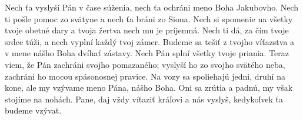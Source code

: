 Nech ťa vyslyší Pán v čase súženia,
nech ťa ochráni meno Boha Jakubovho.
\versseparator
Nech ti pošle pomoc zo svätyne
a nech ťa bráni zo Siona.
\versseparator
Nech si spomenie na všetky tvoje obetné dary
a tvoja žertva nech mu je príjemná.
\versseparator
Nech ti dá, za čím tvoje srdce túži,
a nech vyplní každý tvoj zámer.
\versseparator
Budeme sa tešiť z tvojho víťazstva
a v mene nášho Boha dvíhať zástavy.
\versseparator
Nech Pán splní všetky tvoje priania.
Teraz viem, že Pán zachráni svojho pomazaného;
\versseparator
vyslyší ho zo svojho svätého neba,
zachráni ho mocou spásonosnej pravice.
\versseparator
Na vozy sa spoliehajú jedni, druhí na kone,
ale my vzývame meno Pána, nášho Boha.
\versseparator
Oni sa zrútia a padnú,
my však stojíme na nohách.
\versseparator
Pane, daj vždy víťaziť kráľovi
a nás vyslyš, kedykoľvek ťa budeme vzývať.
